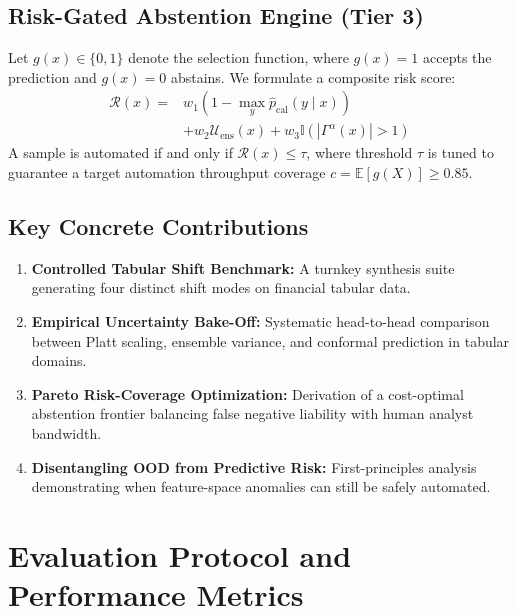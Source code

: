 \documentclass[10pt,a4paper,twocolumn]{article}
\begin{document}
\subsection{Risk-Gated Abstention Engine (Tier 3)}
Let $g(x) \in \{0, 1\}$ denote the selection function, where $g(x) = 1$ accepts the prediction and $g(x) = 0$ abstains. We formulate a composite risk score:
\begin{equation}
  \begin{split}
    \mathcal{R}(x) = {} & w_1 \left(1 - \max_{y} \hat{p}_{\text{cal}}(y \mid x)\right) \\
    & + w_2 \mathcal{U}_{\text{ens}}(x) + w_3 \mathbb{I}\left(|\Gamma^\alpha(x)| > 1\right)
  \end{split}
\end{equation}
A sample is automated if and only if $\mathcal{R}(x) \le \tau$, where threshold $\tau$ is tuned to guarantee a target automation throughput coverage $c = \mathbb{E}[g(X)] \ge 0.85$.

\subsection{Key Concrete Contributions}
\begin{calloutbox}[title={Project Contributions}]
\begin{enumerate}[leftmargin=1.2em]
  \item \textbf{Controlled Tabular Shift Benchmark:} A turnkey synthesis suite generating four distinct shift modes on financial tabular data.
  \item \textbf{Empirical Uncertainty Bake-Off:} Systematic head-to-head comparison between Platt scaling, ensemble variance, and conformal prediction in tabular domains.
  \item \textbf{Pareto Risk-Coverage Optimization:} Derivation of a cost-optimal abstention frontier balancing false negative liability with human analyst bandwidth.
  \item \textbf{Disentangling OOD from Predictive Risk:} First-principles analysis demonstrating when feature-space anomalies can still be safely automated.
\end{enumerate}
\end{calloutbox}

\section{Evaluation Protocol and Performance Metrics}
\end{document}
